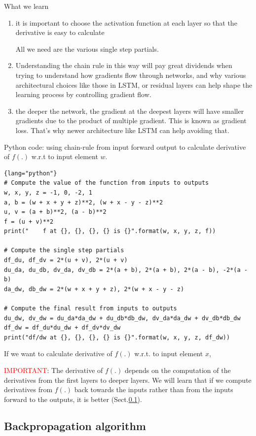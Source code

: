 What we learn
\begin{enumerate}
  \item it is important to choose the activation function at each layer so that the derivative is easy to calculate
  
  All we need are the various single step partials.
  
  \item Understanding the chain rule in this way will pay great dividends when trying to understand how gradients flow through networks, and why various architectural choices like those in LSTM,
  or residual layers can help shape the learning process by controlling gradient flow.
  
  \item the deeper the network, the gradient at the deepest layers will have smaller gradients due to the product of multiple gradient. 
  This is known as gradient loss. That's why newer architecture like LSTM can help avoiding that.
\end{enumerate}

Python code: using chain-rule from input forward output to calculate derivative of $f(.)$ w.r.t to input element $w$. 
\begin{lstlisting}{lang="python"}
# Compute the value of the function from inputs to outputs
w, x, y, z = -1, 0, -2, 1
a, b = (w + x + y + z)**2, (w + x - y - z)**2
u, v = (a + b)**2, (a - b)**2
f = (u + v)**2
print("    f at {}, {}, {}, {} is {}".format(w, x, y, z, f))

# Compute the single step partials
df_du, df_dv = 2*(u + v), 2*(u + v)
du_da, du_db, dv_da, dv_db = 2*(a + b), 2*(a + b), 2*(a - b), -2*(a - b)
da_dw, db_dw = 2*(w + x + y + z), 2*(w + x - y - z)

# Compute the final result from inputs to outputs
du_dw, dv_dw = du_da*da_dw + du_db*db_dw, dv_da*da_dw + dv_db*db_dw
df_dw = df_du*du_dw + df_dv*dv_dw
print("df/dw at {}, {}, {}, {} is {}".format(w, x, y, z, df_dw))
\end{lstlisting}
If we want to calculate derivative of $f(.)$ w.r.t. to input element $x$, 

\textcolor{red}{IMPORTANT}: The derivative of $f(.)$ depends on the computation of the derivatives from the first layers to deeper layers.
We will learn that if we compute derivatives from 
$f(.)$  back towards the inputs rather than from the inputs forward to the outputs, it is better (Sect.\ref{sec:Backpropagation-algorithm}). 

\subsection{Backpropagation algorithm}
\label{sec:Backpropagation-algorithm}

